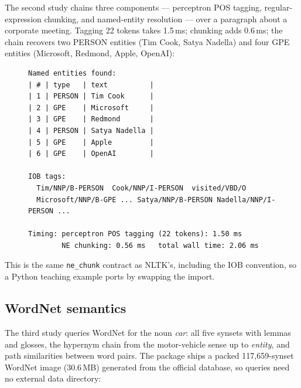 \documentclass[smallextended]{svjour3}
\begin{document}
The second study chains three components --- perceptron POS tagging, regular-expression chunking, and named-entity resolution --- over a paragraph about a corporate meeting. Tagging 22 tokens takes 1.5\,ms; chunking adds 0.6\,ms; the chain recovers two PERSON entities (Tim Cook, Satya Nadella) and four GPE entities (Microsoft, Redmond, Apple, OpenAI):

\begin{figure}[H]
\begin{lstlisting}[basicstyle=\ttfamily\scriptsize,caption={Captured output of \texttt{paper/usecases/information\_extraction.ts} (abridged).},label={lst:ie}]
Named entities found:
| # | type   | text          |
| 1 | PERSON | Tim Cook      |
| 2 | GPE    | Microsoft     |
| 3 | GPE    | Redmond       |
| 4 | PERSON | Satya Nadella |
| 5 | GPE    | Apple         |
| 6 | GPE    | OpenAI        |

IOB tags:
  Tim/NNP/B-PERSON  Cook/NNP/I-PERSON  visited/VBD/O
  Microsoft/NNP/B-GPE ... Satya/NNP/B-PERSON Nadella/NNP/I-PERSON ...

Timing: perceptron POS tagging (22 tokens): 1.50 ms
        NE chunking: 0.56 ms   total wall time: 2.06 ms
\end{lstlisting}
\end{figure}

This is the same \texttt{ne\_chunk} contract as NLTK's, including the IOB convention, so a Python teaching example ports by swapping the import.

\subsection{WordNet semantics}
\label{sec:uc-wordnet}

The third study queries WordNet for the noun \emph{car}: all five synsets with lemmas and glosses, the hypernym chain from the motor-vehicle sense up to \emph{entity}, and path similarities between word pairs. The package ships a packed 117{,}659-synset WordNet image (30.6\,MB) generated from the official database, so queries need no external data directory:
\end{document}
